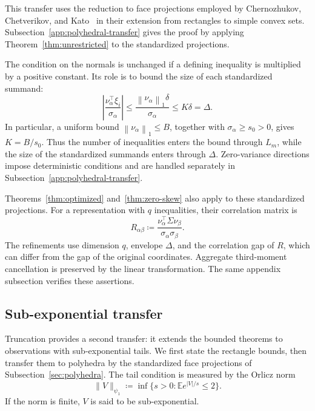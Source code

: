 \documentclass[11pt,letterpaper]{article}
\theoremstyle{remark}
\newcommand{\E}{\mathbb E}
\newcommand{\norm}[1]{\left\lVert#1\right\rVert}
\begin{document}
This transfer uses the reduction to face projections employed by
Chernozhukov, Chetverikov, and Kato~\cite[Section~3.1 and the proof of
Proposition~3.1]{CCK2017} in their extension from rectangles to simple
convex sets. Subsection~\ref{app:polyhedral-transfer} gives the proof
by applying Theorem~\ref{thm:unrestricted} to the standardized
projections.

The condition on the normals is unchanged if a defining inequality
is multiplied by a positive constant. Its role is to bound the size
of each standardized summand:
\[
 \left|\frac{\nu_\alpha^\top\xi_i}{\sigma_\alpha}\right|
 \le\frac{\norm{\nu_\alpha}_1\delta}{\sigma_\alpha}
 \le K\delta=\Delta.
\]
In particular, a uniform bound \(\norm{\nu_\alpha}_1\le B\),
together with \(\sigma_\alpha\ge s_0>0\), gives \(K=B/s_0\).
Thus the number of inequalities enters the bound through \(L_m\),
while the size of the standardized summands enters through \(\Delta\).
Zero-variance directions impose deterministic conditions and are
handled separately in Subsection~\ref{app:polyhedral-transfer}.

Theorems~\ref{thm:optimized} and~\ref{thm:zero-skew} also apply to
these standardized projections. For a representation with \(q\)
inequalities, their correlation matrix is
\[
 R_{\alpha\beta}\coloneqq
 \frac{\nu_\alpha^\top\Sigma\nu_\beta}
      {\sigma_\alpha\sigma_\beta}.
\]
The refinements use dimension \(q\), envelope \(\Delta\), and the
correlation gap of \(R\), which can differ from the gap of the
original coordinates. Aggregate third-moment cancellation is
preserved by the linear transformation. The same appendix subsection
verifies these assertions.

\subsection{Sub-exponential transfer}\label{sec:subexponential}
Truncation provides a second transfer: it extends the bounded theorems
to observations with sub-exponential tails. We first state the rectangle
bounds, then transfer them to polyhedra by the standardized face
projections of Subsection~\ref{sec:polyhedra}. The tail condition is
measured by the Orlicz norm
\[
 \|V\|_{\psi_1}\coloneqq \inf\{s>0:\E e^{|V|/s}\le2\}.
\]
If the norm is finite, \(V\) is said to be sub-exponential.
\end{document}
